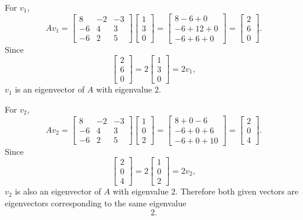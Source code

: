 \documentclass[12pt]{article}
\begin{document}
For $v_1$,
\[
Av_1=
\begin{bmatrix}
8&-2&-3\\
-6&4&3\\
-6&2&5
\end{bmatrix}
\begin{bmatrix}1\\3\\0\end{bmatrix}
=
\begin{bmatrix}
8-6+0\\
-6+12+0\\
-6+6+0
\end{bmatrix}
=
\begin{bmatrix}2\\6\\0\end{bmatrix}.
\]
Since
\[
\begin{bmatrix}2\\6\\0\end{bmatrix}
=2\begin{bmatrix}1\\3\\0\end{bmatrix}=2v_1,
\]
$v_1$ is an eigenvector of $A$ with eigenvalue $2$.

For $v_2$,
\[
Av_2=
\begin{bmatrix}
8&-2&-3\\
-6&4&3\\
-6&2&5
\end{bmatrix}
\begin{bmatrix}1\\0\\2\end{bmatrix}
=
\begin{bmatrix}
8+0-6\\
-6+0+6\\
-6+0+10
\end{bmatrix}
=
\begin{bmatrix}2\\0\\4\end{bmatrix}.
\]
Since
\[
\begin{bmatrix}2\\0\\4\end{bmatrix}
=2\begin{bmatrix}1\\0\\2\end{bmatrix}=2v_2,
\]
$v_2$ is also an eigenvector of $A$ with eigenvalue $2$.
Therefore both given vectors are eigenvectors corresponding to the same eigenvalue
\[
\boxed{2.}
\]
\end{document}
